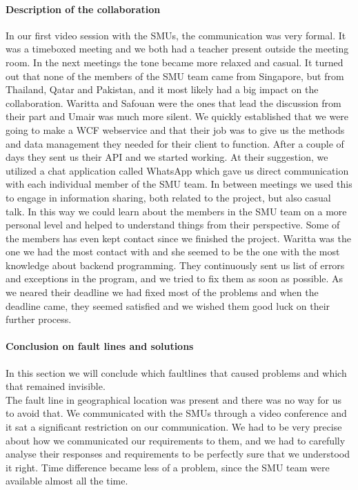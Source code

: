 \documentclass[a4paper,11pt,report]{article}
\begin{document}
{\paragraph{Description of the collaboration }
In our first video session with the SMUs, the communication was very formal. It was a timeboxed meeting and we both had a teacher present outside the meeting room. In the next meetings the tone became more relaxed and casual. It turned out that none of the members of the SMU team came from Singapore, but from Thailand, Qatar and Pakistan, and it most likely had a big impact on the collaboration. Waritta and Safouan were the ones that lead the discussion from their part and Umair was much more silent. We quickly established that we were going to make a WCF webservice and that their job was to give us the methods and data management they needed for their client to function. After a couple of days they sent us their API and we started working. At their suggestion, we utilized a chat application called WhatsApp\cite{whatsapp} which gave us direct communication with each individual member of the SMU team. In between meetings we used this to engage in information sharing, both related to the project, but also casual talk. In this way we could learn about the members in the SMU team on a more personal level and helped to understand things from their perspective. Some of the members has even kept contact since we finished the project. Waritta was the one we had the most contact with and she seemed to be the one with the most knowledge about backend programming. They continuously sent us list of errors and exceptions in the program, and we tried to fix them as soon as possible. As we neared their deadline we had fixed most of the problems and when the deadline came, they seemed satisfied and we wished them good luck on their further process. \\

\paragraph{Conclusion on fault lines and solutions}
In this section we will conclude which faultlines that caused problems and which that remained invisible. \\

The fault line in geographical location was present and there was no way for us to avoid that. We communicated with the SMUs through a video conference and it sat a significant restriction on our communication. We had to be very precise about how we communicated our requirements to them, and we had to carefully analyse their responses and requirements to be perfectly sure that we understood it right. Time difference became less of a problem, since the SMU team were available almost all the time. \\

}
\end{document}
